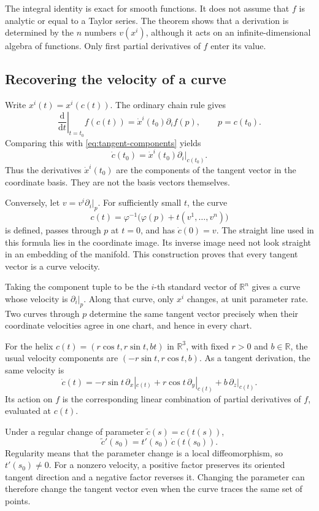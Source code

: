\documentclass[11pt,a4paper]{article}
\numberwithin{equation}{section}
\newcommand{\R}{\mathbb R}
\newcommand{\dd}{\mathrm d}
\begin{document}
The integral identity is exact for smooth functions. It does not assume
that \(f\) is analytic or equal to a Taylor series. The theorem shows
that a derivation is determined by the \(n\) numbers \(v(x^i)\), although
it acts on an infinite-dimensional algebra of functions. Only first
partial derivatives of \(f\) enter its value.

\subsection{Recovering the velocity of a curve}

Write \(x^i(t)=x^i(c(t))\). The ordinary chain rule gives
\[
 \left.\frac{\dd}{\dd t}\right|_{t=t_0}f(c(t))
 =\dot x^i(t_0)\partial_i f(p),\qquad p=c(t_0).
\]
Comparing this with \eqref{eq:tangent-components} yields
\begin{equation}
 \dot c(t_0)=\dot x^i(t_0)\partial_i|_{c(t_0)}.
 \label{eq:velocity-components}
\end{equation}
Thus the derivatives \(\dot x^i(t_0)\) are the components of the tangent
vector in the coordinate basis. They are not the basis vectors themselves.

Conversely, let \(v=v^i\partial_i|_p\). For sufficiently small \(t\),
the curve
\[
 c(t)=\varphi^{-1}\bigl(\varphi(p)+t(v^1,\ldots,v^n)\bigr)
\]
is defined, passes through \(p\) at \(t=0\), and has \(\dot c(0)=v\).
The straight line used in this formula lies in the coordinate image.
Its inverse image need not look straight in an embedding of the manifold.
This construction proves that every tangent vector is a curve velocity.

Taking the component tuple to be the \(i\)-th standard vector of
\(\R^n\) gives a curve whose velocity is \(\partial_i|_p\). Along that
curve, only \(x^i\) changes, at unit parameter rate. Two curves through
\(p\) determine the same tangent vector precisely when their coordinate
velocities agree in one chart, and hence in every chart.

For the helix \(c(t)=(r\cos t,r\sin t,bt)\) in \(\R^3\), with fixed
\(r>0\) and \(b\in\R\), the usual velocity components are
\((-r\sin t,r\cos t,b)\). As a tangent derivation, the same velocity is
\[
 \dot c(t)=-r\sin t\,\partial_x|_{c(t)}
            +r\cos t\,\partial_y|_{c(t)}
            +b\,\partial_z|_{c(t)}.
\]
Its action on \(f\) is the corresponding linear combination of partial
derivatives of \(f\), evaluated at \(c(t)\).

Under a regular change of parameter \(\widetilde c(s)=c(t(s))\),
\[
 \widetilde c'(s_0)=t'(s_0)\,\dot c(t(s_0)).
\]
Regularity means that the parameter change is a local diffeomorphism, so
\(t'(s_0)\neq0\). For a nonzero velocity, a positive factor preserves
its oriented tangent direction and a negative factor reverses it.
Changing the parameter can therefore change the tangent vector even when
the curve traces the same set of points.
\end{document}
